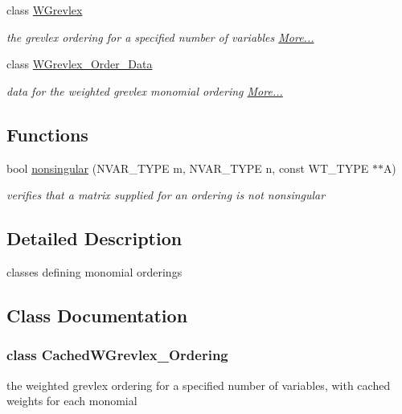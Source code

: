 \begin{DoxyCompactItemize}
class \hyperlink{group__orderinggroup_class_w_grevlex}{W\+Grevlex}
\begin{DoxyCompactList}\small\item\em the grevlex ordering for a specified number of variables  \hyperlink{group__orderinggroup_class_w_grevlex}{More...}\end{DoxyCompactList}\item 
class \hyperlink{group__orderinggroup_class_w_grevlex___order___data}{W\+Grevlex\+\_\+\+Order\+\_\+\+Data}
\begin{DoxyCompactList}\small\item\em data for the weighted grevlex monomial ordering  \hyperlink{group__orderinggroup_class_w_grevlex___order___data}{More...}\end{DoxyCompactList}\end{DoxyCompactItemize}
\subsection*{Functions}
\begin{DoxyCompactItemize}
\item 
bool \hyperlink{group__orderinggroup_ga22e2d4b10cd30468c9e67351ab78aa27}{nonsingular} (N\+V\+A\+R\+\_\+\+T\+Y\+PE m, N\+V\+A\+R\+\_\+\+T\+Y\+PE n, const W\+T\+\_\+\+T\+Y\+PE $\ast$$\ast$A)
\begin{DoxyCompactList}\small\item\em verifies that a matrix supplied for an ordering is not nonsingular \end{DoxyCompactList}\end{DoxyCompactItemize}


\subsection{Detailed Description}
classes defining monomial orderings 



\subsection{Class Documentation}
\label{class_cached_w_grevlex___ordering}
\subsubsection{class Cached\+W\+Grevlex\+\_\+\+Ordering}
the weighted grevlex ordering for a specified number of variables, with cached weights for each monomial 

